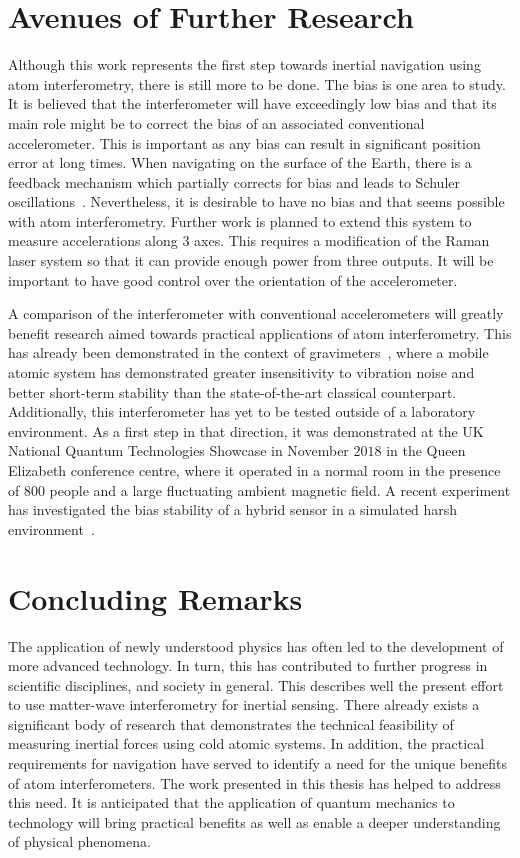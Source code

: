 \section{Avenues of Further Research}
Although this work represents the first step towards inertial
navigation using atom interferometry, there is still more to be done.
The bias is one area to study. It is believed that the
interferometer will have exceedingly low bias and that its main role
might be to correct the bias of an associated conventional
accelerometer. This is important as any bias can result in significant
position error at long times. When navigating on the surface of the
Earth, there is a feedback mechanism which partially corrects for bias
and leads to Schuler oscillations~\cite{Schuler1923}. Nevertheless, it
is desirable to have no bias and that seems possible with atom
interferometry. Further work is planned to extend this system to measure accelerations
along 3 axes. This requires a modification of the Raman laser system so
that it can provide enough power from three outputs. It will be
important to have good control over the orientation of the
accelerometer.
\par\noindent
A comparison of the interferometer with conventional
accelerometers will greatly benefit research aimed towards
practical applications of atom interferometry. This has already been
demonstrated in the context of gravimeters~\cite{Farah2014,Gillot2014}, where a
mobile atomic system has demonstrated greater insensitivity to
vibration noise and better short-term stability than the
state-of-the-art classical counterpart. Additionally, this interferometer has
yet to be tested outside of a laboratory environment. As a first step
in that direction, it was demonstrated at the UK National Quantum
Technologies Showcase in November $2018$ in the Queen Elizabeth
 conference centre, where it operated in a normal room in the
presence of 800 people and a large fluctuating ambient magnetic field. A recent
experiment has investigated the bias stability of a hybrid sensor in a
simulated harsh environment~\cite{Cheiney2018}.   
\section{Concluding Remarks}
The application of newly understood physics has often led to the
development of more advanced technology. In turn, this has contributed
to further progress in scientific disciplines, and society in general.
This describes well the present effort to use matter-wave
interferometry for inertial sensing. There already exists a significant
body of research that demonstrates the technical feasibility of
measuring inertial forces using cold atomic systems. In addition, the
practical requirements for navigation have served to identify a need
for the unique benefits of atom interferometers. The work presented
in this thesis has helped to address this need. It is anticipated that
the application of quantum mechanics to technology will
bring practical benefits as well as enable a deeper understanding of
physical phenomena.
